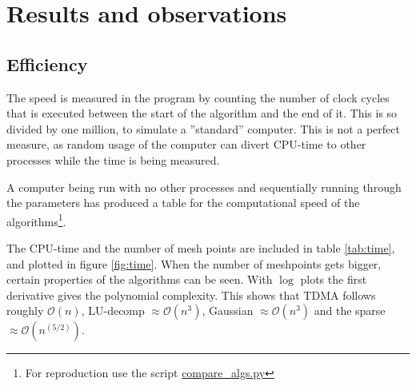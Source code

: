 \documentclass[11pt,a4paper,english]{article}
\numberwithin{equation}{section}
\newcommand{\bigO}[1]{\mathcal{O}\left( #1 \right)}
\begin{document}
\section{Results and observations}

\subsection{Efficiency}

The speed is measured in the program by counting the number of clock
cycles that is executed between the start of the algorithm and the 
end of it. This is so divided by one million, to simulate a 
''standard'' computer. This is not a perfect measure, as random usage
of the computer can divert CPU-time to other processes while the time
is being measured. 

A computer being run with no other processes and sequentially running
through the parameters has produced a table for the computational speed
of the algorithms\footnote{For reproduction use the script 
\url{compare_algs.py}}.

The CPU-time and the number of mesh points are included
in table \ref{tab:time}, and plotted in figure \ref{fig:time}. When
the number of meshpoints gets bigger, certain properties of the algorithms
can be seen. With $\log$ plots the first derivative gives the polynomial 
complexity. This shows that TDMA follows roughly $\bigO{n}$,
LU-decomp $\approx \bigO{n^3}$, Gaussian $\approx \bigO{n^3}$ and the 
sparse $\approx \bigO{n^{(5/2)}}$. 
\end{document}
